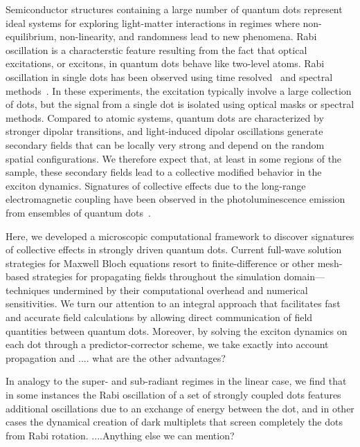 Semiconductor structures containing a large number of quantum dots represent ideal systems for exploring light-matter interactions in regimes where non-equilibrium, non-linearity, and randomness lead to new phenomena.
Rabi oscillation is a characterstic feature resulting from the fact that optical excitations, or excitons, in  quantum dots behave like two-level atoms.
Rabi oscillation in single  dots has been observed using time resolved~\cite{stievater, shih} and spectral methods~\cite{kamada}.
 In these experiments,  the excitation typically involve a large collection of dots, but the signal from a single dot is isolated using optical masks or spectral methods.
Compared to atomic systems, quantum dots are characterized by stronger dipolar transitions, and light-induced dipolar oscillations generate secondary fields that can be locally very strong and depend on the random spatial configurations.
We therefore expect that, at least in some regions of the  sample, these secondary fields lead to a collective modified behavior in the exciton dynamics.
 Signatures of collective effects due to the long-range electromagnetic coupling have been observed in the photoluminescence emission from ensembles of quantum dots~\cite{forchel}.


Here, we developed a microscopic computational framework to discover signatures of collective effects in strongly driven quantum dots.
Current full-wave solution strategies for Maxwell Bloch equations resort to finite-difference or other mesh-based strategies\cite{Vanneste2001, Fratalocchi2008} for propagating fields throughout the simulation domain---techniques undermined by their computational overhead and numerical sensitivities\cite{Baczewski2013}.
 We turn our attention to an integral approach that facilitates fast and accurate field calculations by allowing direct communication of field quantities between quantum dots.
 Moreover, by solving the exciton dynamics on each dot through a predictor-corrector scheme, we take exactly into account propagation and .... what are the other advantages? 

In analogy to the super- and sub-radiant regimes in the linear case, we find that in some instances the Rabi oscillation of a set of strongly coupled dots features additional oscillations due to an exchange of energy between the dot, and in other cases the dynamical creation of dark multiplets that screen completely the dots from Rabi rotation. ....Anything else we can mention?
